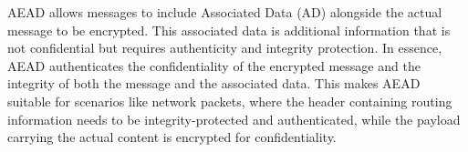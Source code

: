 \begin{itemize}
    AEAD allows messages to include Associated Data (AD) alongside the actual message to be encrypted. This associated
    data is additional information that is not confidential but requires authenticity and integrity protection. In essence, AEAD authenticates the
    confidentiality of the encrypted message and the integrity of both the message and the associated data. This makes AEAD suitable for scenarios
    like network packets, where the header containing routing information needs to be integrity-protected and authenticated, while the payload
    carrying the actual content is encrypted for confidentiality. \label{aead}
\end{itemize}


